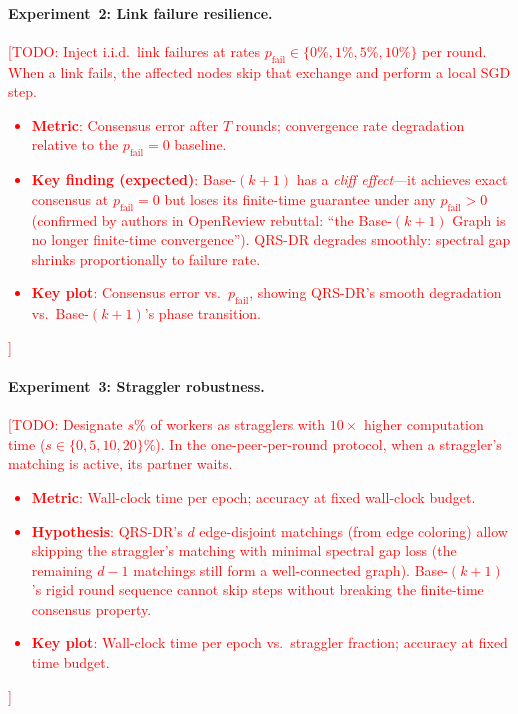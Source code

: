 \documentclass{article}
\begin{document}
\paragraph{Experiment~2: Link failure resilience.}
\textcolor{red}{[TODO: Inject i.i.d.\ link failures at rates
$p_{\text{fail}} \in \{0\%, 1\%, 5\%, 10\%\}$ per round.  When a link
fails, the affected nodes skip that exchange and perform a local SGD step.
\begin{itemize}
\item \textbf{Metric}: Consensus error after $T$ rounds; convergence rate
    degradation relative to the $p_{\text{fail}}=0$ baseline.
\item \textbf{Key finding (expected)}: Base-$(k{+}1)$ has a \emph{cliff
    effect}---it achieves exact consensus at $p_{\text{fail}}=0$ but loses
    its finite-time guarantee under any $p_{\text{fail}} > 0$
    (confirmed by authors in OpenReview rebuttal: ``the Base-$(k{+}1)$
    Graph is no longer finite-time convergence'').  QRS-DR degrades smoothly:
    spectral gap shrinks proportionally to failure rate.
\item \textbf{Key plot}: Consensus error vs.\ $p_{\text{fail}}$, showing
    QRS-DR's smooth degradation vs.\ Base-$(k{+}1)$'s phase transition.
\end{itemize}]}

\paragraph{Experiment~3: Straggler robustness.}
\textcolor{red}{[TODO: Designate $s\%$ of workers as stragglers with
$10\times$ higher computation time ($s \in \{0, 5, 10, 20\}$\%).
In the one-peer-per-round protocol, when a straggler's matching is
active, its partner waits.
\begin{itemize}
\item \textbf{Metric}: Wall-clock time per epoch; accuracy at fixed
    wall-clock budget.
\item \textbf{Hypothesis}: QRS-DR's $d$ edge-disjoint matchings (from edge coloring) allow
    skipping the straggler's matching with minimal spectral gap loss
    (the remaining $d{-}1$ matchings still form a well-connected graph).
    Base-$(k{+}1)$'s rigid round sequence cannot skip steps without
    breaking the finite-time consensus property.
\item \textbf{Key plot}: Wall-clock time per epoch vs.\ straggler
    fraction; accuracy at fixed time budget.
\end{itemize}]}
\end{document}
